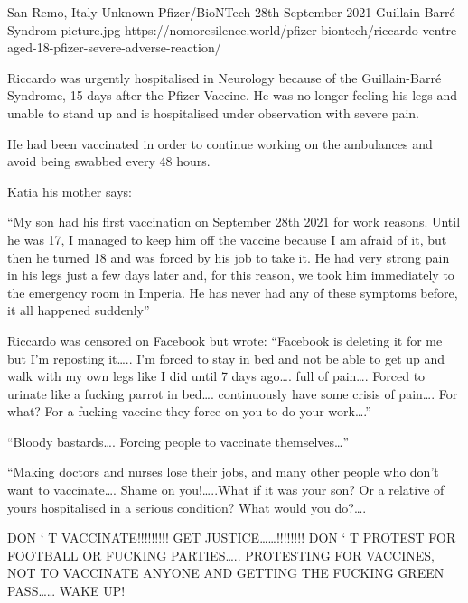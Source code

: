 {San Remo, Italy}
{Unknown}
{Pfizer/BioNTech}
{28th September 2021}
{Guillain-Barré Syndrom}
{picture.jpg}
{https://nomoresilence.world/pfizer-biontech/riccardo-ventre-aged-18-pfizer-severe-adverse-reaction/}
{

Riccardo was urgently hospitalised in Neurology because of the Guillain-Barré
Syndrome, 15 days after the Pfizer Vaccine. He was no longer feeling his legs
and unable to stand up and is hospitalised under observation with severe pain.

He had been vaccinated in order to continue working on the ambulances and avoid being swabbed every 48 hours.

Katia his mother says:

“My son had his first vaccination on September 28th 2021 for work reasons. Until
he was 17, I managed to keep him off the vaccine because I am afraid of it, but
then he turned 18 and was forced by his job to take it. He had very strong pain
in his legs just a few days later and, for this reason, we took him immediately
to the emergency room in Imperia. He has never had any of these symptoms before,
it all happened suddenly”

Riccardo was censored on Facebook but wrote: “Facebook is deleting it for me but
I’m reposting it…..  I’m forced to stay in bed and not be able to get up and
walk with my own legs like I did until 7 days ago…. full of pain…. Forced to
urinate like a fucking parrot in bed…. continuously have some crisis of pain….
For what? For a fucking vaccine they force on you to do your work….”

“Bloody bastards…. Forcing people to vaccinate themselves…”

“Making doctors and nurses lose their jobs, and many other people who don’t want
to vaccinate…. Shame on you!…..What if it was your son? Or a relative of yours
hospitalised in a serious condition?  What would you do?….

DON ‘ T VACCINATE!!!!!!!!!  GET JUSTICE……!!!!!!!!  DON ‘ T PROTEST FOR FOOTBALL
OR FUCKING PARTIES…..  PROTESTING FOR VACCINES, NOT TO VACCINATE ANYONE AND
GETTING THE FUCKING GREEN PASS……  WAKE UP!

}
